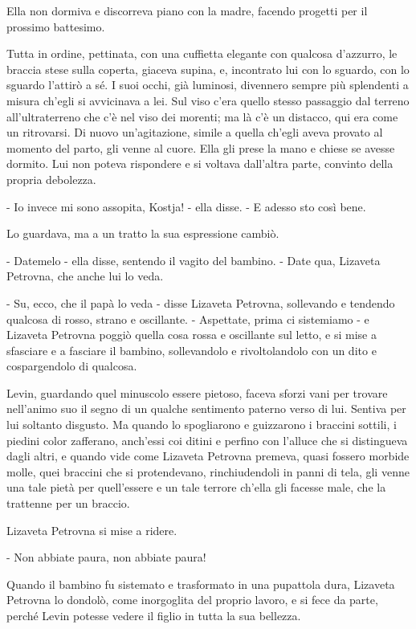 Ella non dormiva e discorreva piano con la madre, facendo progetti per il prossimo battesimo. 

Tutta in ordine, pettinata, con una cuffietta elegante con qualcosa d'azzurro, le braccia stese sulla coperta, giaceva supina, e, incontrato lui con lo sguardo, con lo sguardo l'attirò a sé. I suoi occhi, già luminosi, divennero sempre più splendenti a misura ch'egli si avvicinava a lei. Sul viso c'era quello stesso passaggio dal terreno all'ultraterreno che c'è nel viso dei morenti; ma là c'è un distacco, qui era come un ritrovarsi. Di nuovo un'agitazione, simile a quella ch'egli aveva provato al momento del parto, gli venne al cuore. Ella gli prese la mano e chiese se avesse dormito. Lui non poteva rispondere e si voltava dall'altra parte, convinto della propria debolezza. 

- Io invece mi sono assopita, Kostja! - ella disse. - E adesso sto così bene. 

Lo guardava, ma a un tratto la sua espressione cambiò. 

- Datemelo - ella disse, sentendo il vagito del bambino. - Date qua, Lizaveta Petrovna, che anche lui lo veda. 

- Su, ecco, che il papà lo veda - disse Lizaveta Petrovna, sollevando e tendendo qualcosa di rosso, strano e oscillante. - Aspettate, prima ci sistemiamo - e Lizaveta Petrovna poggiò quella cosa rossa e oscillante sul letto, e si mise a sfasciare e a fasciare il bambino, sollevandolo e rivoltolandolo con un dito e cospargendolo di qualcosa. 

Levin, guardando quel minuscolo essere pietoso, faceva sforzi vani per trovare nell'animo suo il segno di un qualche sentimento paterno verso di lui. Sentiva per lui soltanto disgusto. Ma quando lo spogliarono e guizzarono i braccini sottili, i piedini color zafferano, anch'essi coi ditini e perfino con l'alluce che si distingueva dagli altri, e quando vide come Lizaveta Petrovna premeva, quasi fossero morbide molle, quei braccini che si protendevano, rinchiudendoli in panni di tela, gli venne una tale pietà per quell'essere e un tale terrore ch'ella gli facesse male, che la trattenne per un braccio. 

Lizaveta Petrovna si mise a ridere. 

- Non abbiate paura, non abbiate paura! 

Quando il bambino fu sistemato e trasformato in una pupattola dura, Lizaveta Petrovna lo dondolò, come inorgoglita del proprio lavoro, e si fece da parte, perché Levin potesse vedere il figlio in tutta la sua bellezza. 

